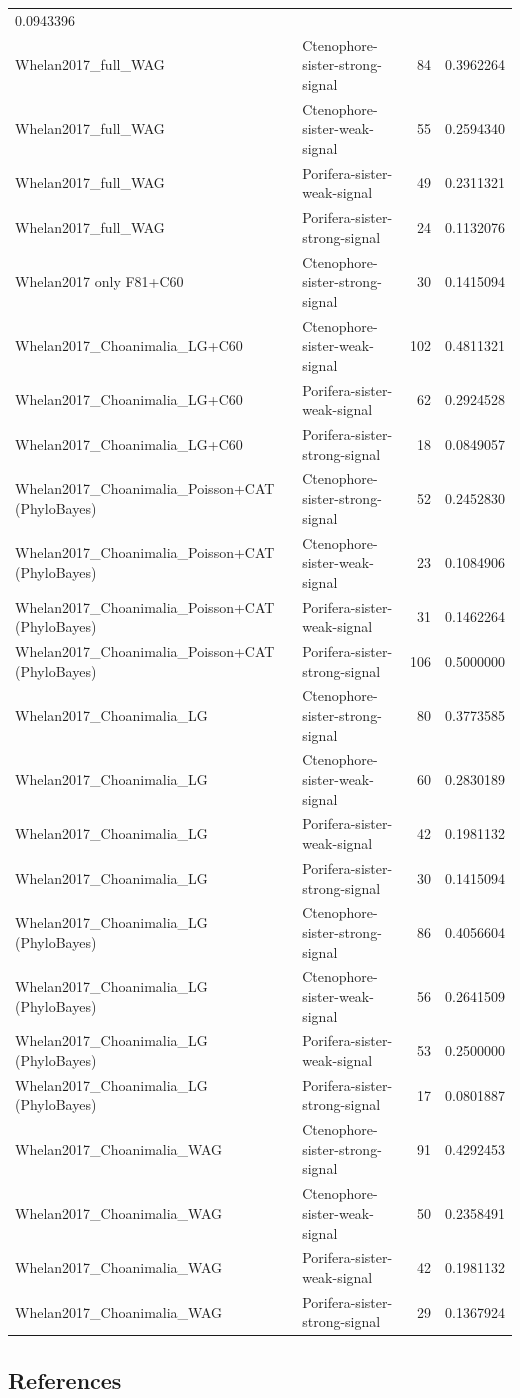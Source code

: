 \documentclass[]{article}
\begin{document}
\begin{longtable}[]{@{}llrr@{}}
0.0943396\tabularnewline
Whelan2017\_full\_WAG & Ctenophore-sister-strong-signal & 84 &
0.3962264\tabularnewline
Whelan2017\_full\_WAG & Ctenophore-sister-weak-signal & 55 &
0.2594340\tabularnewline
Whelan2017\_full\_WAG & Porifera-sister-weak-signal & 49 &
0.2311321\tabularnewline
Whelan2017\_full\_WAG & Porifera-sister-strong-signal & 24 &
0.1132076\tabularnewline
Whelan2017 only F81+C60 & Ctenophore-sister-strong-signal & 30 &
0.1415094\tabularnewline
Whelan2017\_Choanimalia\_LG+C60 & Ctenophore-sister-weak-signal & 102 &
0.4811321\tabularnewline
Whelan2017\_Choanimalia\_LG+C60 & Porifera-sister-weak-signal & 62 &
0.2924528\tabularnewline
Whelan2017\_Choanimalia\_LG+C60 & Porifera-sister-strong-signal & 18 &
0.0849057\tabularnewline
Whelan2017\_Choanimalia\_Poisson+CAT (PhyloBayes) &
Ctenophore-sister-strong-signal & 52 & 0.2452830\tabularnewline
Whelan2017\_Choanimalia\_Poisson+CAT (PhyloBayes) &
Ctenophore-sister-weak-signal & 23 & 0.1084906\tabularnewline
Whelan2017\_Choanimalia\_Poisson+CAT (PhyloBayes) &
Porifera-sister-weak-signal & 31 & 0.1462264\tabularnewline
Whelan2017\_Choanimalia\_Poisson+CAT (PhyloBayes) &
Porifera-sister-strong-signal & 106 & 0.5000000\tabularnewline
Whelan2017\_Choanimalia\_LG & Ctenophore-sister-strong-signal & 80 &
0.3773585\tabularnewline
Whelan2017\_Choanimalia\_LG & Ctenophore-sister-weak-signal & 60 &
0.2830189\tabularnewline
Whelan2017\_Choanimalia\_LG & Porifera-sister-weak-signal & 42 &
0.1981132\tabularnewline
Whelan2017\_Choanimalia\_LG & Porifera-sister-strong-signal & 30 &
0.1415094\tabularnewline
Whelan2017\_Choanimalia\_LG (PhyloBayes) &
Ctenophore-sister-strong-signal & 86 & 0.4056604\tabularnewline
Whelan2017\_Choanimalia\_LG (PhyloBayes) & Ctenophore-sister-weak-signal
& 56 & 0.2641509\tabularnewline
Whelan2017\_Choanimalia\_LG (PhyloBayes) & Porifera-sister-weak-signal &
53 & 0.2500000\tabularnewline
Whelan2017\_Choanimalia\_LG (PhyloBayes) & Porifera-sister-strong-signal
& 17 & 0.0801887\tabularnewline
Whelan2017\_Choanimalia\_WAG & Ctenophore-sister-strong-signal & 91 &
0.4292453\tabularnewline
Whelan2017\_Choanimalia\_WAG & Ctenophore-sister-weak-signal & 50 &
0.2358491\tabularnewline
Whelan2017\_Choanimalia\_WAG & Porifera-sister-weak-signal & 42 &
0.1981132\tabularnewline
Whelan2017\_Choanimalia\_WAG & Porifera-sister-strong-signal & 29 &
0.1367924\tabularnewline
\bottomrule
\end{longtable}

\hypertarget{references}{%
\subsection*{References}\label{references}}
\end{document}
